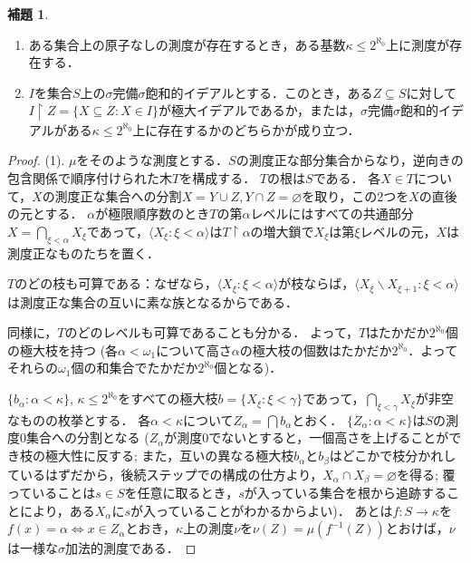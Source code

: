 \documentclass[uplatex]{jsarticle}
\newcommand{\restrict}{\upharpoonright}
\newcommand{\seq}[1]{{\langle#1\rangle}}
\renewcommand\emptyset{\varnothing}
\renewcommand\subset{\subseteq}
\renewcommand{\setminus}{\smallsetminus}
\theoremstyle{definition}
\newtheorem{lem}[thm]{補題}
\begin{document}
	\begin{lem}\label{lem:continuum}
		\begin{enumerate}
			\item ある集合上の原子なしの測度が存在するとき，ある基数$\kappa \le 2^{\aleph_0}$上に測度が存在する．
			\item $I$を集合$S$上の$\sigma$完備$\sigma$飽和的イデアルとする．このとき，ある$Z \subset S$に対して$I \restrict Z = \{ X \subset Z : X \in I \}$が極大イデアルであるか，または，$\sigma$完備$\sigma$飽和的イデアルがある$\kappa \le 2^{\aleph_0}$上に存在するかのどちらかが成り立つ．
		\end{enumerate}
	\end{lem}
	\begin{proof}
		(1). $\mu$をそのような測度とする．$S$の測度正な部分集合からなり，逆向きの包含関係で順序付けられた木$T$を構成する．
		$T$の根は$S$である．
		各$X \in T$について，$X$の測度正な集合への分割$X = Y \cup Z, Y \cap Z = \emptyset$を取り，この2つを$X$の直後の元とする．
		$\alpha$が極限順序数のとき$T$の第$\alpha$レベルにはすべての共通部分$X = \bigcap_{\xi < \alpha} X_\xi$であって，$\seq{X_\xi : \xi < \alpha}$は$T \restrict \alpha$の増大鎖で$X_\xi$は第$\xi$レベルの元，$X$は測度正なものたちを置く．
		
		$T$のどの枝も可算である：なぜなら，$\seq{X_\xi : \xi < \alpha}$が枝ならば，$\seq{ X_\xi \setminus X_{\xi+1} : \xi < \alpha }$は測度正な集合の互いに素な族となるからである．
		
		同様に，$T$のどのレベルも可算であることも分かる．
		よって，$T$はたかだか$2^{\aleph_0}$個の極大枝を持つ (各$\alpha < \omega_1$について高さ$\alpha$の極大枝の個数はたかだか$2^{\aleph_0}$．よってそれらの$\omega_1$個の和集合でたかだか$2^{\aleph_0}$個となる)．
		
		$\{ b_\alpha : \alpha < \kappa \}$, $\kappa \le 2^{\aleph_0}$をすべての極大枝$b = \{ X_\xi : \xi < \gamma \}$であって，$\bigcap_{\xi < \gamma} X_\xi$が非空なものの枚挙とする．
		各$\alpha < \kappa$について$Z_\alpha = \bigcap b_\alpha$とおく．
		$\{ Z_\alpha : \alpha < \kappa \}$は$S$の測度$0$集合への分割となる 
		($Z_\alpha$が測度$0$でないとすると，一個高さを上げることができ枝の極大性に反する; また，互いの異なる極大枝$b_\alpha$と$b_\beta$はどこかで枝分かれしているはずだから，後続ステップでの構成の仕方より，$X_\alpha \cap X_\beta = \emptyset$を得る; 覆っていることは$s \in S$を任意に取るとき，$s$が入っている集合を根から追跡することにより，ある$X_\alpha$に$s$が入っていることがわかるからよい)．
		あとは$f \colon S \to \kappa$を$f(x) = \alpha \iff x \in Z_\alpha$とおき，$\kappa$上の測度$\nu$を$\nu(Z) = \mu(f^{-1}(Z))$とおけば，$\nu$は一様な$\sigma$加法的測度である．
		

\end{proof}
\end{document}
